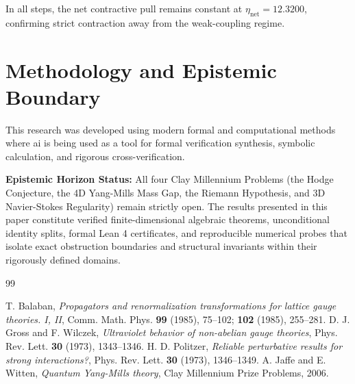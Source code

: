 \documentclass[11pt,a4paper]{article}
\theoremstyle{definition}
\begin{document}
\noindent In all steps, the net contractive pull remains constant at $\eta_{\mathrm{net}} = 12.3200$, confirming strict contraction away from the weak-coupling regime.


\section{Methodology and Epistemic Boundary}
\noindent This research was developed using modern formal and computational methods where ai is being used as a tool for formal verification synthesis, symbolic calculation, and rigorous cross-verification.

\vspace{0.5em}
\noindent\textbf{Epistemic Horizon Status:} All four Clay Millennium Problems (the Hodge Conjecture, the 4D Yang-Mills Mass Gap, the Riemann Hypothesis, and 3D Navier-Stokes Regularity) remain strictly open. The results presented in this paper constitute verified finite-dimensional algebraic theorems, unconditional identity splits, formal Lean 4 certificates, and reproducible numerical probes that isolate exact obstruction boundaries and structural invariants within their rigorously defined domains.

\begin{thebibliography}{99}

 T. Balaban, \emph{Propagators and renormalization transformations for lattice gauge theories. I, II}, Comm. Math. Phys. \textbf{99} (1985), 75--102; \textbf{102} (1985), 255--281.
 D. J. Gross and F. Wilczek, \emph{Ultraviolet behavior of non-abelian gauge theories}, Phys. Rev. Lett. \textbf{30} (1973), 1343--1346.
 H. D. Politzer, \emph{Reliable perturbative results for strong interactions?}, Phys. Rev. Lett. \textbf{30} (1973), 1346--1349.
 A. Jaffe and E. Witten, \emph{Quantum Yang-Mills theory}, Clay Millennium Prize Problems, 2006.

\end{thebibliography}
\end{document}
